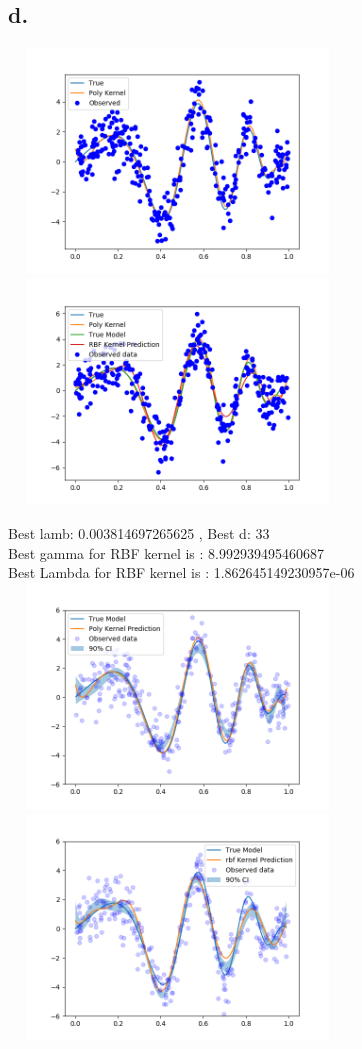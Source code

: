 \documentclass{article}
\begin{document}
\subsection*{d.}
\includegraphics[width=9cm, height=6cm]{plots/A3d_1.png}
\includegraphics[width=9cm, height=6cm]{plots/A3d_2.png} \newline

Best lamb:  0.003814697265625 , Best d:  33 \\

Best gamma for RBF kernel is :  8.992939495460687 \\
Best Lambda for RBF kernel is : 1.862645149230957e-06 \\
\includegraphics[width=9cm, height=6cm]{plots/A3e_1.png}
\includegraphics[width=9cm, height=6cm]{plots/A3e_2.png}
\end{document}
